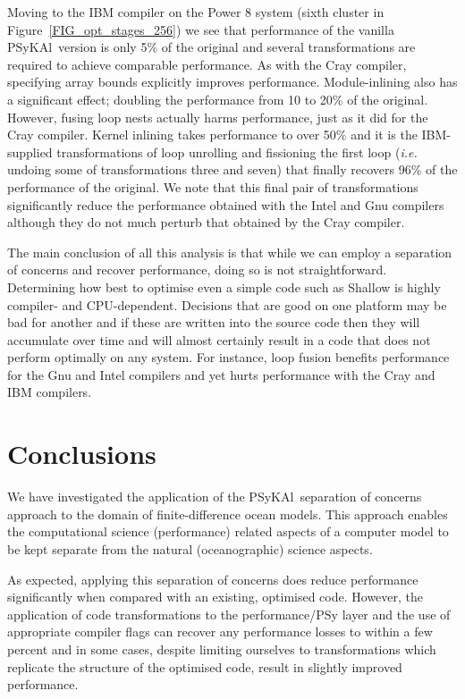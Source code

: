 \documentclass{IOS-Book-Article}
\newcommand{\psykal}{{PS}y{KA}l\ }
\begin{document}
Moving to the IBM compiler on the Power 8 system (sixth cluster in
Figure~\ref{FIG_opt_stages_256}) we see that performance of the
vanilla \psykal version is only 5\% of the original and several
transformations are required to achieve comparable performance. As
with the Cray compiler, specifying array bounds explicitly improves
performance. Module-inlining also has a significant effect; doubling
the performance from 10 to 20\% of the original. However, fusing loop
nests actually harms performance, just as it did for the Cray
compiler. Kernel inlining takes performance to over 50\% and it is the
IBM-supplied transformations of loop unrolling and fissioning the
first loop ({\it i.e.} undoing some of transformations three and
seven) that finally recovers 96\% of the performance of the
original. We note that this final pair of transformations significantly
reduce the performance obtained with the Intel and Gnu compilers
although they do not much perturb that obtained by the Cray
compiler.

The main conclusion of all this analysis is that while we can employ a
separation of concerns and recover performance, doing so is not
straightforward. Determining how best to optimise even a simple code
such as Shallow is highly compiler- and CPU-dependent. Decisions that
are good on one platform may be bad for another and if these are
written into the source code then they will accumulate over time and
will almost certainly result in a code that does not perform optimally
on any system. For instance, loop fusion benefits performance for the
Gnu and Intel compilers and yet hurts performance with the Cray and
IBM compilers.

\section{Conclusions}

We have investigated the application of the \psykal separation of
concerns approach to the domain of finite-difference ocean
models. This approach enables the computational science (performance)
related aspects of a computer model to be kept separate from the
natural (oceanographic) science aspects.

As expected, applying this separation of concerns does reduce
performance significantly when compared with an existing, optimised
code. However, the application of code transformations to the
performance/PSy layer and the use of appropriate compiler flags can
recover any performance losses to within a few percent and in some
cases, despite limiting ourselves to transformations which replicate
the structure of the optimised code, result in slightly improved
performance.
\end{document}
